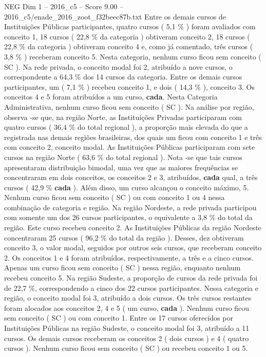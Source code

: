 \begin{textsample}{NEG Dim 1 – 2016\_c5 – Score 9.00 – 2016\_c5/enade\_2016\_zoot\_f32beec87b.txt}
Entre os demais cursos de Instituições Públicas participantes, quatro cursos ( 5,1 \% ) foram avaliados com conceito 1, 18 cursos ( 22,8 \% da categoria ) obtiveram conceito 2, 18 cursos ( 22,8 \% da categoria ) obtiveram conceito 4 e, como já comentado, três cursos ( 3,8 \% ) receberam conceito 5.
Nesta categoria, nenhum curso ficou sem conceito ( SC ).
Na rede privada, o conceito modal foi 2, atribuído a nove cursos, o correspondente a 64,3 \% dos 14 cursos da categoria.
Entre os demais cursos participantes, um ( 7,1 \% ) recebeu conceito 1, e dois ( 14,3 \% ), conceito 3.
Os conceitos 4 e 5 foram atribuídos a um curso, \textbf{cada}.
Nesta Categoria Administrativa, nenhum curso ficou sem conceito ( SC ).
Na análise por região, observa -se que, na região Norte, as Instituições Privadas participaram com quatro cursos ( 36,4 \% do total regional ), a proporção mais elevada do que a registrada nas demais regiões brasileiras, dos quais um ficou com conceito 1 e três com conceito 2, conceito modal.
As Instituições Públicas participaram com sete cursos na região Norte ( 63,6 \% do total regional ).
Nota -se que tais cursos apresentaram distribuição bimodal, uma vez que as maiores frequências se concentraram em dois conceitos, os conceitos 2 e 3, atribuídos, \textbf{cada} qual, a três cursos ( 42,9 \% \textbf{cada} ).
Além disso, um curso alcançou o conceito máximo, 5.
Nenhum curso ficou sem conceito ( SC ) ou com conceito 1 ou 4 nessa combinação de categoria e região.
Na região Nordeste, a rede privada participou com somente um dos 26 cursos participantes, o equivalente a 3,8 \% do total da região.
Este curso recebeu conceito 2.
As Instituições Públicas da região Nordeste concentraram 25 cursos ( 96,2 \% do total da região ).
Desses, dez obtiveram conceito 3, o valor modal, seguidos por outros seis cursos, que receberam conceito 2.
Os conceitos 1 e 4 foram atribuídos, respectivamente, a três e a cinco cursos.
Apenas um curso ficou sem conceito ( SC ) nessa região, enquanto nenhum recebeu conceito 5.
Na região Sudeste, a proporção de cursos da rede privada foi de 22,7 \%, correspondendo a cinco dos 22 cursos participantes.
Nessa categoria e região, o conceito modal foi 3, atribuído a dois cursos.
Os três cursos restantes foram alocados aos conceitos 2, 4 e 5 ( um curso, \textbf{cada} ).
Nenhum curso ficou sem conceito ( SC ) ou com conceito 1.
Entre os 17 cursos oferecidos por Instituições Públicas na região Sudeste, o conceito modal foi 3, atribuído a 11 cursos.
Os demais cursos receberam os conceitos 2 ( dois cursos ) e 4 ( quatro cursos ).
Nenhum curso ficou sem conceito ( SC ) ou recebeu conceito 1 ou 5.

\end{textsample}
